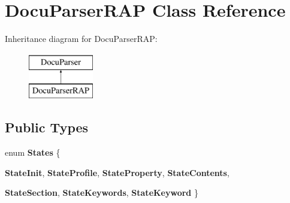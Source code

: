 \hypertarget{classDocuParserRAP}{
\section{DocuParserRAP Class Reference}
\label{classDocuParserRAP}
}
Inheritance diagram for DocuParserRAP:\begin{figure}[H]
\begin{center}
\leavevmode
\includegraphics[height=2.000000cm]{classDocuParserRAP}
\end{center}
\end{figure}
\subsection*{Public Types}
\begin{DoxyCompactItemize}
\item 
enum {\bfseries States} \{ \par
{\bfseries StateInit}, 
{\bfseries StateProfile}, 
{\bfseries StateProperty}, 
{\bfseries StateContents}, 
\par
{\bfseries StateSection}, 
{\bfseries StateKeywords}, 
{\bfseries StateKeyword}
 \}
\end{DoxyCompactItemize}
